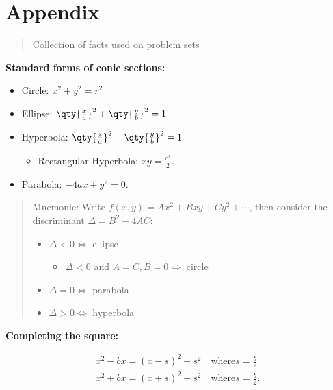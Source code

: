 \hypertarget{appendix}{%
\section{Appendix}\label{appendix}}

\begin{quote}
Collection of facts used on problem sets
\end{quote}

\textbf{Standard forms of conic sections:}

\begin{itemize}
\tightlist
\item
  Circle: \(x^2 + y^2 = r^2\)
\item
  Ellipse: \(\qty{\frac x a}^2 + \qty{\frac y b}^2 = 1\)
\item
  Hyperbola: \(\qty{\frac x a}^2 - \qty{\frac y b}^2 = 1\)

  \begin{itemize}
  \tightlist
  \item
    Rectangular Hyperbola: \(xy = \frac{c^2}{2}\).
  \end{itemize}
\item
  Parabola: \(-4ax + y^2 = 0\).
\end{itemize}

\begin{quote}
Mnemonic: Write \(f(x, y) = Ax^2 + Bxy + Cy^2 + \cdots\), then consider
the discriminant \(\Delta = B^2 - 4AC\):

\begin{itemize}
\tightlist
\item
  \(\Delta < 0 \iff\) ellipse

  \begin{itemize}
  \tightlist
  \item
    \(\Delta < 0\) and \(A=C, B=0 \iff\) circle
  \end{itemize}
\item
  \(\Delta = 0 \iff\) parabola
\item
  \(\Delta > 0 \iff\) hyperbola
\end{itemize}
\end{quote}

\textbf{Completing the square:}

\begin{align*}
x^2 - bx = (x - s)^2 - s^2 \quad\text{where} s = \frac{b}{2} \\
x^2 + bx = (x + s)^2 - s^2 \quad\text{where} s = \frac{b}{2}
.\end{align*}

